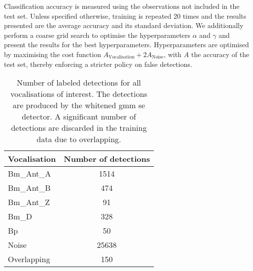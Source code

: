 {Classification accuracy is measured using the observations not included in the test set. Unless specified otherwise, training is repeated 20 times and the results presented are the average accuracy and its standard deviation. We additionally perform a coarse grid search to optimise the hyperparameters $\alpha$ and $\gamma$ and present the results for the best hyperparameters. Hyperparameters are optimised by maximising the cost function $A_\text{Vocalisation} + 2A_\text{Noise}$, with $A$ the accuracy of the test set, thereby enforcing a stricter policy on false detections.




\begin{table}[h!]
\caption{Number of labeled detections for all vocalisations of interest. The detections are produced by the whitened \ac{gmm} \ac{se} detector. A significant number of detections are discarded in the training data due to overlapping.}
\label{tab:numdetections}
\begin{tabular}{lc} 
\textbf{Vocalisation}      & \textbf{Number of detections}  \\ \hline
Bm\_Ant\_A & 1514              \\
Bm\_Ant\_B & 474              \\
Bm\_Ant\_Z & 91               \\
Bm\_D      & 328               \\
Bp & 50                \\
Noise      & 25638          \\
Overlapping & 150 \footnotemark[1]      \\ 
\end{tabular}
\end{table}


}
